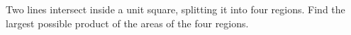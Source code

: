 Two lines intersect inside a unit square, splitting it into four regions. Find the largest possible product of the areas of the four regions.
